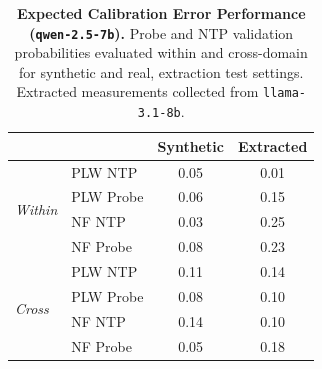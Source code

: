 \begin{table}[ht]
\centering
\begin{tabular}{ll cc}
\toprule
& & Synthetic & Extracted \\
\midrule
\multirow{4}{*}{\textit{Within}}
& PLW NTP & 0.05 & 0.01 \\
& PLW Probe & 0.06 & 0.15 \\
& NF NTP & 0.03 & 0.25 \\
& NF Probe & 0.08 & 0.23 \\
\midrule
\multirow{4}{*}{\textit{Cross}}
& PLW NTP & 0.11 & 0.14 \\
& PLW Probe & 0.08 & 0.10 \\
& NF NTP & 0.14 & 0.10 \\
& NF Probe & 0.05 & 0.18 \\
\bottomrule
\end{tabular}
\caption{\textbf{Expected Calibration Error Performance (\texttt{qwen-2.5-7b}).} Probe and NTP validation probabilities evaluated within and cross-domain for synthetic and real, extraction test settings. Extracted measurements collected from \texttt{llama-3.1-8b}.}
\label{tab:qwen-2.5-7b-llama-3.1-8b}
\end{table}
